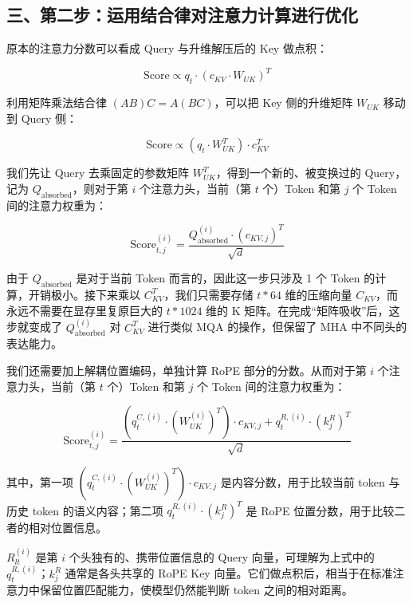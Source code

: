 \hypertarget{ux4e09ux7b2cux4e8cux6b65ux8fd0ux7528ux7ed3ux5408ux5f8bux5bf9ux6ce8ux610fux529bux8ba1ux7b97ux8fdbux884cux4f18ux5316}{%
\subsection{三、第二步：运用结合律对注意力计算进行优化}\label{ux4e09ux7b2cux4e8cux6b65ux8fd0ux7528ux7ed3ux5408ux5f8bux5bf9ux6ce8ux610fux529bux8ba1ux7b97ux8fdbux884cux4f18ux5316}}

原本的注意力分数可以看成 Query 与升维解压后的 Key 做点积：

\[
\mathrm{Score} \propto q_t \cdot (c_{KV} \cdot W_{UK})^T
\]

利用矩阵乘法结合律 \((AB)C=A(BC)\)，可以把 Key 侧的升维矩阵 \(W_{UK}\) 移动到 Query 侧：

\[
\mathrm{Score} \propto (q_t \cdot W_{UK}^T) \cdot c_{KV}^T
\]

我们先让 Query 去乘固定的参数矩阵 \(W_{UK}^T\)，得到一个新的、被变换过的 Query，记为 \(Q_{\mathrm{absorbed}}\)，则对于第 \(i\) 个注意力头，当前（第 \(t\) 个）Token 和第 \(j\) 个 Token 间的注意力权重为：

\[
\mathrm{Score}_{t,j}^{(i)}
=
\frac{Q_{\mathrm{absorbed}}^{(i)} \cdot (c_{KV,j})^T}{\sqrt{d}}
\]

由于 \(Q_{\mathrm{absorbed}}\) 是对于当前 Token 而言的，因此这一步只涉及 1 个 Token 的计算，开销极小。接下来乘以 \(C_{KV}^T\)，我们只需要存储 \(t*64\) 维的压缩向量 \(C_{KV}\)，而永远不需要在显存里复原巨大的 \(t*1024\) 维的 K 矩阵。在完成``矩阵吸收''后，这步就变成了 \(Q_{\mathrm{absorbed}}^{(i)}\) 对 \(C_{KV}^T\) 进行类似 MQA 的操作，但保留了 MHA 中不同头的表达能力。

我们还需要加上解耦位置编码，单独计算 RoPE 部分的分数。从而对于第 \(i\) 个注意力头，当前（第 \(t\) 个）Token 和第 \(j\) 个 Token 间的注意力权重为：

\[
\mathrm{Score}_{t,j}^{(i)}
=
\frac{
\left(q_t^{C,(i)} \cdot (W_{UK}^{(i)})^T\right) \cdot c_{KV,j}
+
q_t^{R,(i)} \cdot (k_j^R)^T
}{\sqrt{d}}
\]

其中，第一项 \(\left(q_t^{C,(i)} \cdot (W_{UK}^{(i)})^T\right) \cdot c_{KV,j}\) 是内容分数，用于比较当前 token 与历史 token 的语义内容；第二项 \(q_t^{R,(i)} \cdot (k_j^R)^T\) 是 RoPE 位置分数，用于比较二者的相对位置信息。

\(R_{lt}^{(i)}\) 是第 \(i\) 个头独有的、携带位置信息的 Query 向量，可理解为上式中的 \(q_t^{R,(i)}\)；\(k_j^R\) 通常是各头共享的 RoPE Key 向量。它们做点积后，相当于在标准注意力中保留位置匹配能力，使模型仍然能判断 token 之间的相对距离。


